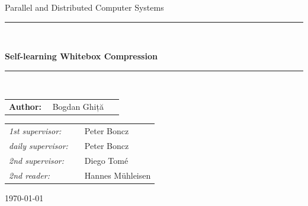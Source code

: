 \documentclass[twoside,11pt]{Latex/Classes/PhDthesisPSnPDF}
\begin{document}
\begin{center}
\vspace*{5mm}

{\Large Parallel and Distributed Computer Systems}

\vspace*{5mm}

\rule{.9\linewidth}{.6pt}\\[0.4cm]
{\huge \bfseries Self-learning Whitebox Compression\par}\vspace{0.4cm}
\rule{.9\linewidth}{.6pt}\\[1.5cm]

\vspace*{1.5mm}

{\Large
\begin{tabular}{l}
{\bf Author:} ~~Bogdan Ghiță ~~%
\end{tabular}
}

\vspace*{1cm}

\begin{tabular}{ll}
{\it 1st supervisor:}   & ~~Peter Boncz \\
{\it daily supervisor:} & ~~Peter Boncz \\
{\it 2nd supervisor:} & ~~Diego Tomé \\
{\it 2nd reader:}       & ~~Hannes Mühleisen
\end{tabular}

\vspace*{2cm}


\vspace*{1.25cm}

\today\\[4cm] %

\end{center}

\newpage


       
\hfuzz=50pt


\end{document}
